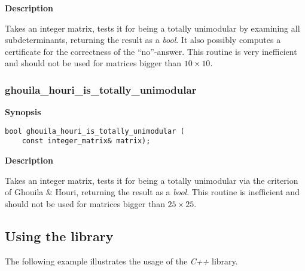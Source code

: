 \documentclass[12pt]{article}
\newcommand{\Cpp}{{\em C++ }}
\begin{document}
{\bf Description}

\vspace{2mm}
Takes an integer matrix, tests it for being a totally unimodular by examining all subdeterminants, returning the result as a {\em bool}.
It also possibly computes a certificate for the correctness of the ``no''-answer. This routine is very inefficient and
should not be used for matrices bigger than $10 \times 10$.

\subsubsection{ghouila\_houri\_is\_totally\_unimodular}

{\bf Synopsis} 

{\tiny
{}
\begin{lstlisting}
bool ghouila_houri_is_totally_unimodular (
    const integer_matrix& matrix);
\end{lstlisting}}

{\bf Description}

\vspace{2mm}
Takes an integer matrix, tests it for being a totally unimodular via the criterion of Ghouila \& Houri, returning the result as a {\em bool}.
This routine is inefficient and should not be used for matrices bigger than $25 \times 25$.

\subsection{Using the library}

The following example illustrates the usage of the \Cpp library.
\end{document}
